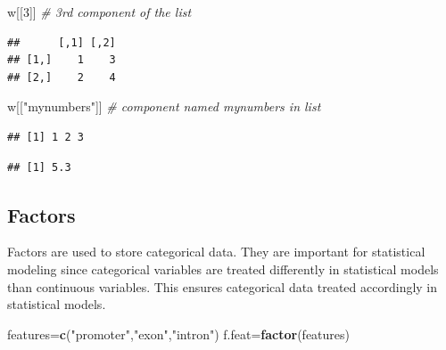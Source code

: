 \documentclass[12pt,]{krantz}
\newenvironment{Shaded}{\begin{snugshade}}{\end{snugshade}}
\newcommand{\CommentTok}[1]{\textcolor[rgb]{0.56,0.35,0.01}{\textit{#1}}}
\newcommand{\DecValTok}[1]{\textcolor[rgb]{0.00,0.00,0.81}{#1}}
\newcommand{\KeywordTok}[1]{\textcolor[rgb]{0.13,0.29,0.53}{\textbf{#1}}}
\newcommand{\NormalTok}[1]{#1}
\newcommand{\OperatorTok}[1]{\textcolor[rgb]{0.81,0.36,0.00}{\textbf{#1}}}
\newcommand{\StringTok}[1]{\textcolor[rgb]{0.31,0.60,0.02}{#1}}
\begin{document}
\begin{Shaded}
\begin{Highlighting}[]
\NormalTok{w[[}\DecValTok{3}\NormalTok{]] }\CommentTok{# 3rd component of the list}
\end{Highlighting}
\end{Shaded}

\begin{verbatim}
##      [,1] [,2]
## [1,]    1    3
## [2,]    2    4
\end{verbatim}

\begin{Shaded}
\begin{Highlighting}[]
\NormalTok{w[[}\StringTok{"mynumbers"}\NormalTok{]] }\CommentTok{# component named mynumbers in list}
\end{Highlighting}
\end{Shaded}

\begin{verbatim}
## [1] 1 2 3
\end{verbatim}

\begin{Shaded}
\end{Shaded}

\begin{verbatim}
## [1] 5.3
\end{verbatim}

\hypertarget{factors}{%
\subsection{Factors}\label{factors}}

Factors are used to store categorical data. They are important for statistical modeling since categorical variables are treated differently in statistical models than continuous variables. This ensures categorical data treated accordingly in statistical models.

\begin{Shaded}
\begin{Highlighting}[]
\NormalTok{features=}\KeywordTok{c}\NormalTok{(}\StringTok{"promoter"}\NormalTok{,}\StringTok{"exon"}\NormalTok{,}\StringTok{"intron"}\NormalTok{)}
\NormalTok{f.feat=}\KeywordTok{factor}\NormalTok{(features)}
\end{Highlighting}
\end{Shaded}
\end{document}
